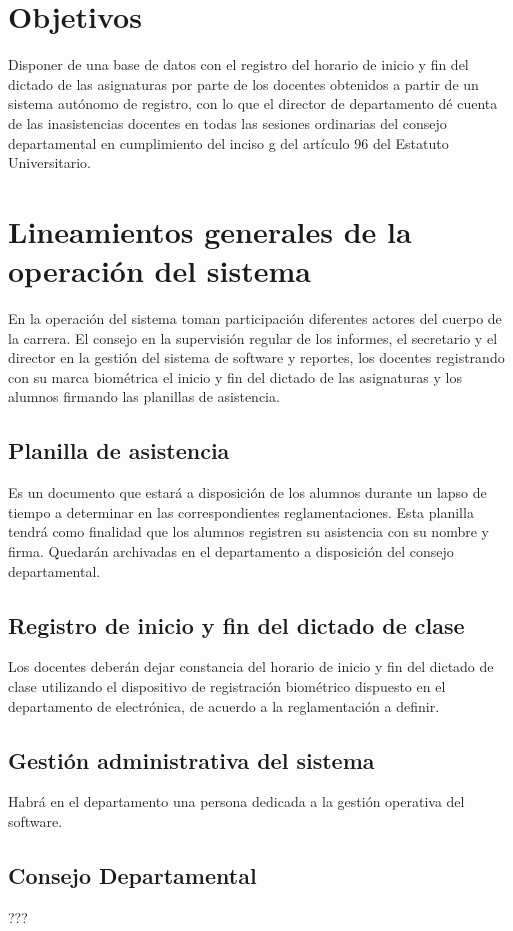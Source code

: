 \documentclass[a4paper, 11pt]{article} %
\begin{document}
\section*{Objetivos}
Disponer de una base de datos con el registro del horario de inicio y fin del dictado de las asignaturas por parte de los docentes obtenidos a partir de un sistema autónomo de registro, con lo que el director de departamento dé cuenta de las inasistencias docentes en todas las sesiones ordinarias del consejo departamental en cumplimiento del inciso g del artículo 96 del Estatuto Universitario. 
\section*{Lineamientos generales de la operación del sistema}
En la operación del sistema toman participación diferentes actores del cuerpo de la carrera. El consejo en la supervisión regular de los informes, el secretario y el director en la gestión del sistema de software y reportes, los docentes registrando con su marca biométrica el inicio y fin del dictado de las asignaturas y los alumnos firmando las planillas de asistencia.
\subsection*{Planilla de asistencia}
Es un documento que estará a disposición de los alumnos durante un lapso de tiempo a determinar en las correspondientes reglamentaciones. Esta planilla tendrá como finalidad que los alumnos registren su asistencia con su nombre y firma. Quedarán archivadas en el departamento a disposición del consejo departamental.
\subsection*{Registro de inicio y fin del dictado de clase}
Los docentes deberán dejar constancia del horario de inicio y fin del dictado de clase utilizando el dispositivo de registración biométrico dispuesto en el departamento de electrónica, de acuerdo a la reglamentación a definir.\\
\subsection*{Gestión administrativa del sistema}
Habrá en el departamento una persona dedicada a la gestión operativa del software.
\subsection*{Consejo Departamental}
???
\end{document}
